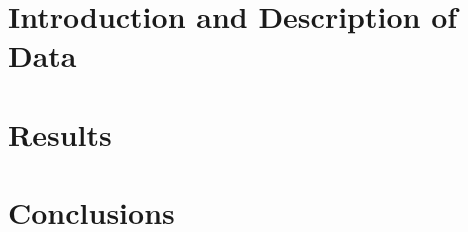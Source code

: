 \documentclass[review]{elsarticle}
\begin{document}
\pagebreak
\linenumbers

\section{Introduction and Description of Data}

%

\section{Results}



\section{Conclusions}




\end{document}
